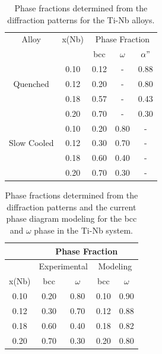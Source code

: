 \newpage
\begin{table}[H]
	\caption{Phase fractions determined from the diffraction patterns for the Ti-Nb alloys.}
	\centering
	\begin{tabular}{ c c c c c }
		\hline
		Alloy & x(Nb) & \multicolumn{3}{c}{Phase Fraction} \\
		&  & bcc & $\omega$ & $\alpha"$ \\
		\hline
		& 0.10 & 0.12 & - & 0.88 \\
		Quenched & 0.12 & 0.20 & - & 0.80 \\
		& 0.18 & 0.57 & - & 0.43 \\
		& 0.20 & 0.70 & - & 0.30 \\
		\hline
		& 0.10 & 0.20 & 0.80 & - \\
		Slow Cooled & 0.12 & 0.30 & 0.70 & - \\
		& 0.18 & 0.60 & 0.40 & - \\
		& 0.20 & 0.70 & 0.30 & - \\
		\hline
	\end{tabular}
	\label{Ch7-table:phasefrac}
\end{table}
\clearpage

\newpage
\begin{table}[H]
	\caption{Phase fractions determined from the diffraction patterns and the current phase diagram modeling for the bcc and $\omega$ phase in the Ti-Nb system.}
	\centering
	\begin{tabular}{ c c c c c }
		\hline
		 &  \multicolumn{4}{c}{Phase Fraction} \\
		 \hline
		& \multicolumn{2}{c}{Experimental} & \multicolumn{2}{c}{Modeling} \\
		\hline
		x(Nb) & bcc & $\omega$ & bcc & $\omega$ \\
		0.10 & 0.20 & 0.80 & 0.10 & 0.90 \\
		0.12 & 0.30 & 0.70 & 0.12 & 0.88 \\
		0.18 & 0.60 & 0.40 & 0.18 & 0.82 \\
		0.20 & 0.70 & 0.30 & 0.20 & 0.80 \\
		\hline
	\end{tabular}
	\label{Ch7-table:omegamodelexp}
\end{table}
\clearpage

